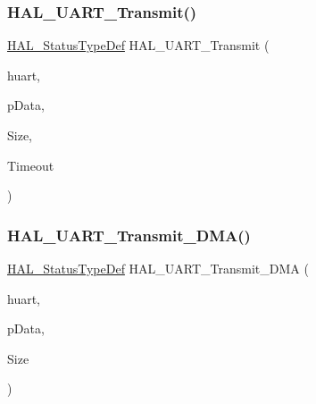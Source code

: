 \subsubsection{\texorpdfstring{H\+A\+L\+\_\+\+U\+A\+R\+T\+\_\+\+Transmit()}{HAL\_UART\_Transmit()}}
{\footnotesize\ttfamily \hyperlink{stm32f4xx__hal__def_8h_a63c0679d1cb8b8c684fbb0632743478f}{H\+A\+L\+\_\+\+Status\+Type\+Def} H\+A\+L\+\_\+\+U\+A\+R\+T\+\_\+\+Transmit (\begin{DoxyParamCaption}\item[{\hyperlink{group___u_a_r_t___exported___types_ga7adf4f3e4c3ecde572be5925c915a967}{U\+A\+R\+T\+\_\+\+Handle\+Type\+Def} $\ast$}]{huart,  }\item[{uint8\+\_\+t $\ast$}]{p\+Data,  }\item[{uint16\+\_\+t}]{Size,  }\item[{uint32\+\_\+t}]{Timeout }\end{DoxyParamCaption})}

\mbox{\label{group___u_a_r_t___exported___functions___group2_ga039ce4af3997f11f55c3c92d043cce77}} 
\subsubsection{\texorpdfstring{H\+A\+L\+\_\+\+U\+A\+R\+T\+\_\+\+Transmit\+\_\+\+D\+M\+A()}{HAL\_UART\_Transmit\_DMA()}}
{\footnotesize\ttfamily \hyperlink{stm32f4xx__hal__def_8h_a63c0679d1cb8b8c684fbb0632743478f}{H\+A\+L\+\_\+\+Status\+Type\+Def} H\+A\+L\+\_\+\+U\+A\+R\+T\+\_\+\+Transmit\+\_\+\+D\+MA (\begin{DoxyParamCaption}\item[{\hyperlink{group___u_a_r_t___exported___types_ga7adf4f3e4c3ecde572be5925c915a967}{U\+A\+R\+T\+\_\+\+Handle\+Type\+Def} $\ast$}]{huart,  }\item[{uint8\+\_\+t $\ast$}]{p\+Data,  }\item[{uint16\+\_\+t}]{Size }\end{DoxyParamCaption})}

\mbox{\label{group___u_a_r_t___exported___functions___group2_gaf223f2bcc2f5734f147cc5c626d757b0}} 
